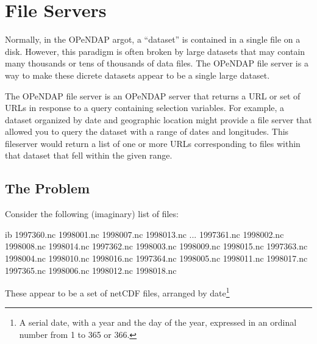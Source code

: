 \chapter{File Servers}
\label{fs}


Normally, in the OPeNDAP
argot, a ``dataset'' is contained in a single file on a disk. However,
this paradigm is often broken by large datasets that may contain many
thousands or tens of thousands of data files. The OPeNDAP file server is
a way to make these dicrete datasets appear to be a single large
dataset.

The OPeNDAP file server is an OPeNDAP server that returns a URL or set of
URLs in response to a query containing selection variables.  For
example, a dataset organized by date and geographic location might
provide a file server that allowed you to query the dataset with a
range of dates and longitudes.  This fileserver would return a list of
one or more URLs corresponding to files within that dataset that fell
within the given range.


\section{The Problem}
\label{fs,problem}

Consider the following (imaginary) list of files:

\begin{vcode}{ib}
1997360.nc  1998001.nc  1998007.nc  1998013.nc ...
1997361.nc  1998002.nc  1998008.nc  1998014.nc
1997362.nc  1998003.nc  1998009.nc  1998015.nc
1997363.nc  1998004.nc  1998010.nc  1998016.nc
1997364.nc  1998005.nc  1998011.nc  1998017.nc
1997365.nc  1998006.nc  1998012.nc  1998018.nc
\end{vcode}

These appear to be a set of netCDF files, arranged by
date\footnote{A serial date, with a year and the day of the
  year, expressed in an ordinal number from 1 to 365 or 366.}

